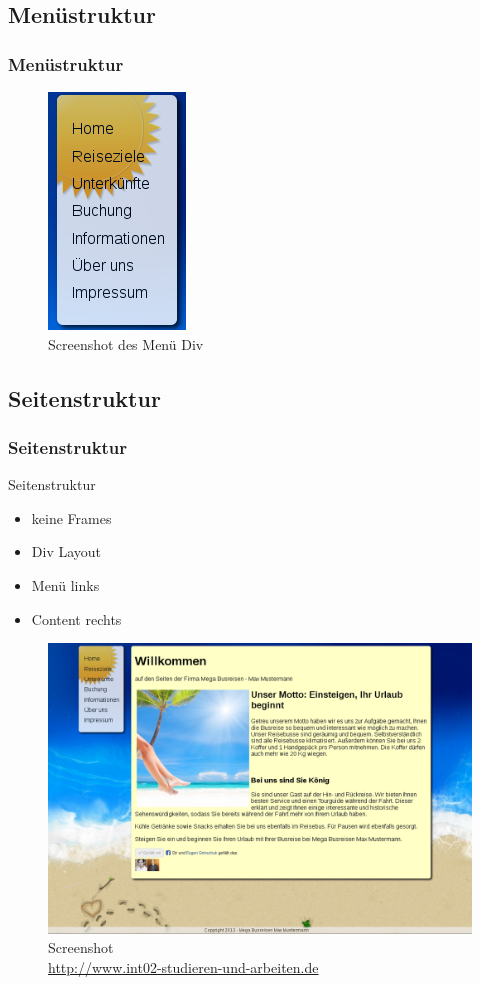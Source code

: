\documentclass[xcolor=dvipsnames]{beamer}
\begin{document}
\subsection{Menüstruktur}
\begin{frame} %
  \frametitle{Menüstruktur} %
	\begin{figure}
	\includegraphics[scale=0.8]{screenshot_menue.png}
	\caption{Screenshot des Menü Div}
	\end{figure}
\end{frame}

\subsection{Seitenstruktur}
\begin{frame} %
  \frametitle{Seitenstruktur} %
  \begin{block}{Seitenstruktur}
	\begin{itemize}
		\item keine Frames
		\item Div Layout
		\item Menü links
		\item Content rechts
	\end{itemize}
  \end{block}
\end{frame}


\begin{frame}
	\begin{figure}
	\includegraphics[scale=0.4]{screenshot_website.png}
	\caption{Screenshot \\ \tiny{\textcolor{gray}				{\url{http://www.int02-studieren-und-arbeiten.de}}}}
	\end{figure}
\end{frame}
\end{document}
